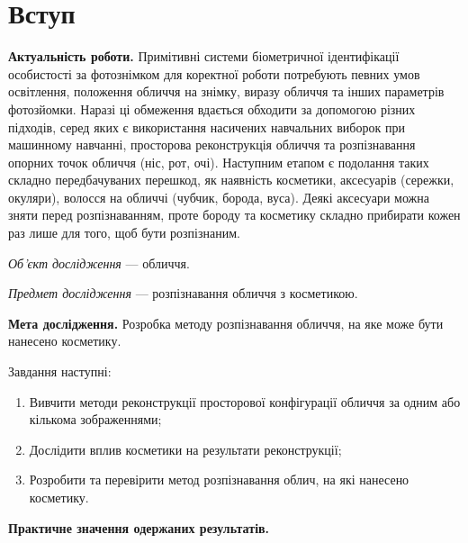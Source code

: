 \chapter*{Вступ}

\textbf{Актуальність роботи.}
Примітивні системи біометричної ідентифікації особистості за фотознімком
для коректної роботи потребують певних умов
освітлення, положення обличчя на знімку, виразу обличчя
та інших параметрів фотозйомки.
Наразі ці обмеження вдається обходити за допомогою різних підходів,
серед яких є
використання насичених навчальних виборок при машинному навчанні,
просторова реконструкція обличчя та
розпізнавання опорних точок обличчя (ніс, рот, очі).
Наступним етапом є подолання таких складно передбачуваних перешкод,
як наявність косметики, аксесуарів (сережки, окуляри),
волосся на обличчі (чубчик, борода, вуса).
Деякі аксесуари можна зняти перед розпізнаванням,
проте бороду та косметику складно прибирати кожен раз лише для того,
щоб бути розпізнаним.

\textit{Об’єкт дослідження} --- обличчя.

\textit{Предмет дослідження} --- розпізнавання обличчя з косметикою.

\textbf{Мета дослідження.}
Розробка методу розпізнавання обличчя, на яке може бути нанесено косметику.

Завдання наступні:
\begin{enumerate}
  \item
    Вивчити методи реконструкції просторової конфігурації обличчя за одним
    або кількома зображеннями;
  \item
    Дослідити вплив косметики на результати реконструкції;
  \item
    Розробити та перевірити метод розпізнавання облич,
    на які нанесено косметику.
\end{enumerate}

\textbf{Практичне значення одержаних результатів.}
